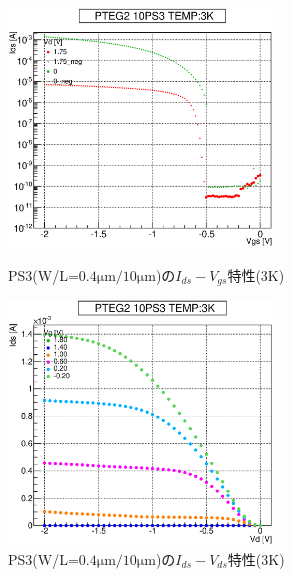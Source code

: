 				\begin{figure}[htbp]
					\begin{minipage}{0.5\hsize}
						\begin{center}
							\includegraphics[width=70mm]{./Chapter/Appendix/Picture/PST/PS3/PTEG2_10_PS3_IdVg_3K.eps}
						\end{center}
						\caption{PS3(W/L=$0.4\mathrm{\mu m}/10\mathrm{\mu m}$)の$I_{ds}-V_{gs}$特性(3K)}
						\label{fig:PS3_IdVg_3K}
					\end{minipage}
					\begin{minipage}{0.5\hsize}
						\begin{center}
							\includegraphics[width=70mm]{./Chapter/Appendix/Picture/PST/PS3/PTEG2_10_PS3_IdVd_3K.eps}
						\end{center}
						\caption{PS3(W/L=$0.4\mathrm{\mu m}/10\mathrm{\mu m}$)の$I_{ds}-V_{ds}$特性(3K)}
						\label{fig:PS3_IdVd_3K}
					\end{minipage}
				\end{figure}
